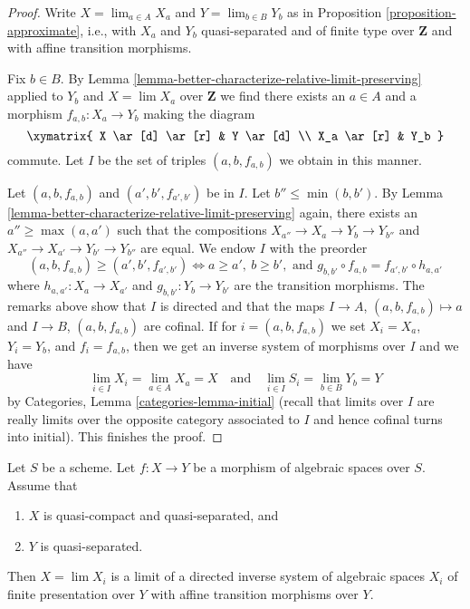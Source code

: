 \begin{proof}
Write $X = \lim_{a \in A} X_a$ and $Y = \lim_{b \in B} Y_b$ as in
Proposition \ref{proposition-approximate}, i.e., with $X_a$ and $Y_b$
quasi-separated and of finite type over $\mathbf{Z}$ and
with affine transition morphisms.

\medskip\noindent
Fix $b \in B$.
By Lemma \ref{lemma-better-characterize-relative-limit-preserving}
applied to $Y_b$ and $X = \lim X_a$ over $\mathbf{Z}$
we find there exists an $a \in A$ and a morphism
$f_{a, b} : X_a \to Y_b$ making the diagram
$$
\xymatrix{
X \ar[d] \ar[r] & Y \ar[d] \\
X_a \ar[r] & Y_b
}
$$
commute. Let $I$ be the set of triples $(a, b, f_{a, b})$ we
obtain in this manner.

\medskip\noindent
Let $(a, b, f_{a, b})$ and $(a', b', f_{a', b'})$ be in $I$.
Let $b'' \leq \min(b, b')$. By
Lemma \ref{lemma-better-characterize-relative-limit-preserving}
again, there exists an $a'' \geq \max(a, a')$ such that
the compositions $X_{a''} \to X_a \to Y_b \to Y_{b''}$ and
$X_{a''} \to X_{a'} \to Y_{b'} \to Y_{b''}$ are equal.
We endow $I$ with the preorder
$$
(a, b, f_{a, b}) \geq (a', b', f_{a', b'})
\Leftrightarrow
a \geq a',\ b \geq b',\text{ and }
g_{b, b'} \circ f_{a, b} = f_{a', b'} \circ h_{a, a'}
$$
where $h_{a, a'} : X_a \to X_{a'}$ and $g_{b, b'} : Y_b \to Y_{b'}$
are the transition morphisms. The remarks above show that $I$
is directed and that the maps $I \to A$, $(a, b, f_{a, b}) \mapsto a$
and $I \to B$, $(a, b, f_{a, b})$ are cofinal. If for $i = (a, b, f_{a, b})$
we set $X_i = X_a$, $Y_i = Y_b$, and $f_i = f_{a, b}$, then we get
an inverse system of morphisms over $I$ and we have
$$
\lim_{i \in I} X_i = \lim_{a \in A} X_a = X
\quad\text{and}\quad
\lim_{i \in I} S_i = \lim_{b \in B} Y_b = Y
$$
by Categories, Lemma \ref{categories-lemma-initial} (recall that
limits over $I$ are really limits over the opposite category
associated to $I$ and hence cofinal turns into initial).
This finishes the proof.
\end{proof}

\begin{lemma}
\label{lemma-relative-approximation}
Let $S$ be a scheme. Let $f : X \to Y$ be a morphism of algebraic spaces
over $S$. Assume that
\begin{enumerate}
\item $X$ is quasi-compact and quasi-separated, and
\item $Y$ is quasi-separated.
\end{enumerate}
Then $X = \lim X_i$ is a limit of a directed inverse system of algebraic spaces
$X_i$ of finite presentation over $Y$ with affine transition morphisms
over $Y$.
\end{lemma}

